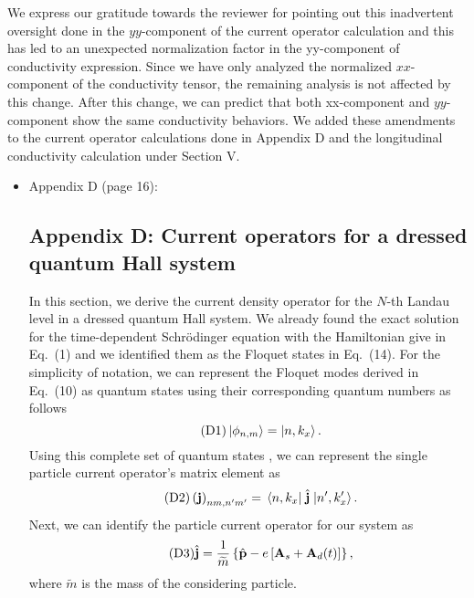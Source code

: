 \documentclass{article}
\begin{document}
We express our gratitude towards the reviewer for pointing out this inadvertent oversight done in the $yy$-component of the current operator calculation and this has led to an unexpected normalization factor in the yy-component of conductivity expression. Since we have only analyzed the normalized $xx$-component of the conductivity tensor, the remaining analysis is not affected by this change. After this change, we can predict that both xx-component and $yy$-component show the same conductivity behaviors. We added these amendments to the current operator calculations done in Appendix D and the longitudinal conductivity calculation under Section V.

\begin{itemize}
  \item Appendix D (page 16):\\
  {\color{Red}
  \subsection*{\label{appendix_d}Appendix D: Current operators for a dressed quantum Hall system}

  In this section, we derive the current density operator for the $N$-th Landau level in a dressed quantum Hall system. We already found the exact solution for the time-dependent Schrödinger equation with the Hamiltonian give in Eq.~(1) and we identified them as the Floquet states in Eq.~(14). For the simplicity of notation, we can represent the Floquet modes derived in Eq.~(10) as quantum states using their corresponding quantum numbers as follows
  \begin{equation} \tag{D1}
    \ket{\phi_{n,m}} = \ket{n,k_x}.
  \end{equation}
  Using this complete set of quantum states \cite{wackerl20,holthaus15,grifoni98}, we can represent the single particle current operator's matrix element as
  \begin{equation} \tag{D2}
    \left(\vb{j} \right)_{nm,n'm'} = \mel{n,k_x}{\;\hat{\vb{j}}\;}{n',k'_x}.
  \end{equation}
  Next, we can identify the particle current operator for our system \cite{mahan00,bruus04} as
  \begin{equation} \tag{D3}
    \hat{\vb{j}} = \frac{1}{\widetilde{m}} \left\{\hat{\vb{p}} - e\left[\vb{A}_s + \vb{A}_d(t) \right]\right\},
  \end{equation}
  where $\widetilde{m}$ is the mass of the considering particle.

}
\end{itemize}
\end{document}
